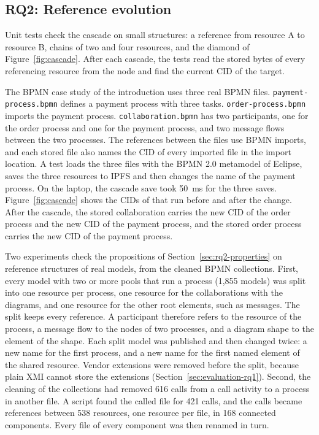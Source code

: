 \documentclass[5p,times,twocolumn]{elsarticle}
\theoremstyle{definition}
\theoremstyle{plain}
\begin{document}
\subsection{RQ2: Reference evolution}\label{sec:evaluation-rq2}

Unit tests check the cascade on small structures: a reference from resource A to resource B, chains of two and four resources, and the diamond of Figure~\ref{fig:cascade}. After each cascade, the tests read the stored bytes of every referencing resource from the node and find the current CID of the target.

The BPMN case study of the introduction uses three real BPMN files. \texttt{payment-process.bpmn} defines a payment process with three tasks. \texttt{order-process.bpmn} imports the payment process. \texttt{collaboration.bpmn} has two participants, one for the order process and one for the payment process, and two message flows between the two processes. The references between the files use BPMN imports, and each stored file also names the CID of every imported file in the import location. A test loads the three files with the BPMN 2.0 metamodel of Eclipse, saves the three resources to IPFS and then changes the name of the payment process. On the laptop, the cascade save took 50~ms for the three saves. Figure~\ref{fig:cascade} shows the CIDs of that run before and after the change. After the cascade, the stored collaboration carries the new CID of the order process and the new CID of the payment process, and the stored order process carries the new CID of the payment process.

Two experiments check the propositions of Section~\ref{sec:rq2-properties} on reference structures of real models, from the cleaned BPMN collections. First, every model with two or more pools that run a process (1,855 models) was split into one resource per process, one resource for the collaborations with the diagrams, and one resource for the other root elements, such as messages. The split keeps every reference. A participant therefore refers to the resource of the process, a message flow to the nodes of two processes, and a diagram shape to the element of the shape. Each split model was published and then changed twice: a new name for the first process, and a new name for the first named element of the shared resource. Vendor extensions were removed before the split, because plain XMI cannot store the extensions (Section~\ref{sec:evaluation-rq1}). Second, the cleaning of the collections had removed 616 calls from a call activity to a process in another file. A script found the called file for 421 calls, and the calls became references between 538 resources, one resource per file, in 168 connected components. Every file of every component was then renamed in turn.
\end{document}
